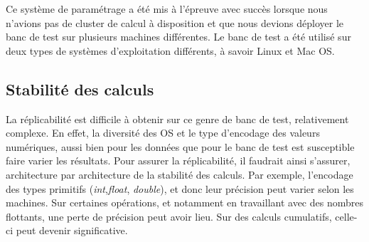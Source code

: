 Ce système de paramétrage a été mis à l'épreuve avec succès lorsque nous n'avions pas de cluster de calcul à disposition et que nous devions déployer le banc de test sur plusieurs machines différentes. Le banc de test a été utilisé sur deux types de systèmes d'exploitation différents, à savoir Linux et Mac OS.

\begin{table}[!t]
    \caption{ Tableau récapitulant les propriétés de notre banc de test. Bien que reproductibles, certaines étapes nécessitent une modification manuelle en fonction des bases de données. Les *, signifie que les résultats sont répétables dans le cas où l'on définit à l'avance les graines des générateurs aléatoires }
    \label{ tab:reproductibility }
\end{table}

\subsection{Stabilité des calculs} 

La réplicabilité est difficile à obtenir sur ce genre de banc de test, relativement complexe. En effet, la diversité des OS et le type d'encodage des valeurs numériques, aussi bien pour les données que pour le banc de test est susceptible faire varier les résultats. Pour assurer la réplicabilité, il faudrait ainsi s'assurer, architecture par architecture de la stabilité des calculs. Par exemple, l'encodage des types primitifs (\textit{int},\textit{float}, \textit{double}), et donc leur précision peut varier selon les machines. Sur certaines opérations, et notamment en travaillant avec des nombres flottants, une perte de précision peut avoir lieu. Sur des calculs cumulatifs, celle-ci peut devenir significative.

